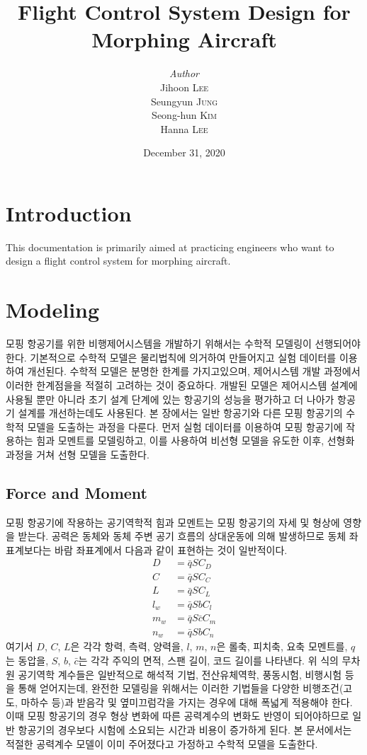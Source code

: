 \documentclass[a4paper, 12pt]{report}
\institute{Seoul National University}
\title{Flight Control System Design for Morphing Aircraft}
\author{\textit{Author}\\Jihoon \textsc{Lee}\\Seungyun \textsc{Jung}\\Seong-hun \textsc{Kim}\\Hanna \textsc{Lee}}
\date{December 31, 2020}
\begin{document}
    \maketitle
    \romantableofcontents

    \chapter{Introduction}

    This documentation is primarily aimed at practicing engineers who want to design a flight control system for morphing aircraft. 

	\chapter{Modeling}

	모핑 항공기를 위한 비행제어시스템을 개발하기 위해서는 수학적 모델링이 선행되어야 한다. 
	기본적으로 수학적 모델은 물리법칙에 의거하여 만들어지고 실험 데이터를 이용하여 개선된다. 
	수학적 모델은 분명한 한계를 가지고있으며, 제어시스템 개발 과정에서 이러한 한계점을을 적절히 고려하는 것이 중요하다.
	개발된 모델은 제어시스템 설계에 사용될 뿐만 아니라 초기 설계 단계에 있는 항공기의 성능을 평가하고 더 나아가 항공기 설계를 개선하는데도 사용된다.
	본 장에서는 일반 항공기와 다른 모핑 항공기의 수학적 모델을 도출하는 과정을 다룬다.
	먼저 실험 데이터를 이용하여 모핑 항공기에 작용하는 힘과 모멘트를 모델링하고, 이를 사용하여 비선형 모델을 유도한 이후, 선형화 과정을 거쳐 선형 모델을 도출한다.
	
	\section{Force and Moment}
	
	모핑 항공기에 작용하는 공기역학적 힘과 모멘트는 모핑 항공기의 자세 및 형상에 영향을 받는다.
	공력은 동체와 동체 주변 공기 흐름의 상대운동에 의해 발생하므로 동체 좌표계보다는 바람 좌표계에서 다음과 같이 표현하는 것이 일반적이다.
	\begin{align}
		D &= \bar{q}SC_D \\
		C &= \bar{q}SC_C \\
		L &= \bar{q}SC_L \\
		l_w &= \bar{q}SbC_l \\
		m_w &= \bar{q}S\bar{c}C_m \\
		n_w &= \bar{q}SbC_n
	\end{align}
	여기서 $D$, $C$, $L$은 각각 항력, 측력, 양력을, $l$, $m$, $n$은 롤축, 피치축, 요축 모멘트를, $q$는 동압을, $S$, $b$, $\bar{c}$는 각각 주익의 면적, 스팬 길이, 코드 길이를 나타낸다.
	위 식의 무차원 공기역학 계수들은 일반적으로 해석적 기법, 전산유체역학, 풍동시험, 비행시험 등을 통해 얻어지는데, 완전한 모델링을 위해서는 이러한 기법들을 다양한 비행조건(고도, 마하수 등)과 받음각 및 옆미끄럼각을 가지는 경우에 대해 폭넓게 적용해야 한다.
	이때 모핑 항공기의 경우 형상 변화에 따른 공력계수의 변화도 반영이 되어야하므로 일반 항공기의 경우보다 시험에 소요되는 시간과 비용이 증가하게 된다.
	본 문서에서는 적절한 공력계수 모델이 이미 주어졌다고 가정하고 수학적 모델을 도출한다.
	
\end{document}
